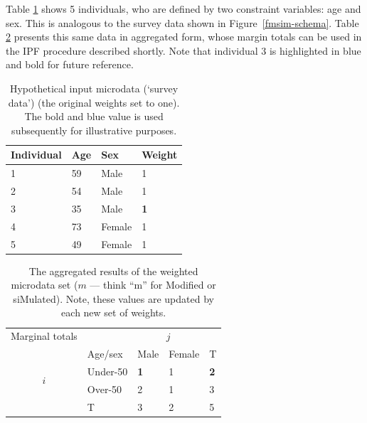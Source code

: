 \documentclass[a4paper, 11pt, twoside]{article}
\begin{document}
Table \ref{t:w} shows 5 individuals, who are defined by two constraint variables:
age and sex. This is analogous to the survey data shown in Figure~\ref{fmsim-schema}.
Table \ref{t:m} presents this same data in aggregated form, whose margin totals can
be used in the IPF procedure described shortly. Note that individual 3 is highlighted in
blue and bold for future reference.

\begin{table}[h]
\caption{Hypothetical input microdata (`survey data')
(the original
weights set to one). The bold and blue value is used subsequently for
illustrative purposes.
}
\label{t:w}
\begin{center}
 \begin{tabular}{llll}
\toprule
{Individual } & {Age} & {Sex}  & {Weight} \\
\midrule
1 & 59 & Male  & 1 \\
2 & 54 & Male & 1 \\
3 & {35} & {Male} & \textbf{\color{blue}1} \\
4 & 73 & Female & 1 \\
5 & 49 & Female & 1 \\
\bottomrule
\end{tabular}
\end{center}
\end{table}

\begin{table}[htbp]
\centering
\caption[The aggregated results of the weighted
microdata set]{The aggregated results of the weighted
microdata set ($m$ --- think ``m'' for Modified or siMulated).
Note, these values are updated by each new set of weights.
}

\begin{tabular}{cllll}\toprule
Marginal totals&  & \multicolumn{2}{c}{$j$} & \\
& Age/sex & Male & Female & T \\ \midrule
\multirow{2}{*}{$i$} & Under-50 & \textbf{\color{blue}1} & 1 & \textbf{\color{blue}2}\\
& Over-50 & 2 & 1 &3 \\
& T & 3 & 2 &5\\
\bottomrule
\end{tabular}
\label{t:m}
\end{table}
\end{document}
